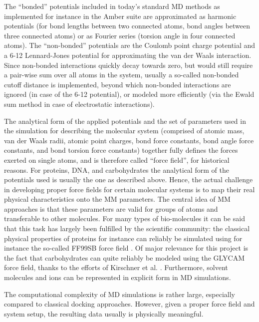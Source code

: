 The \enquote{bonded} potentials included in today's standard MD methods as
implemented for instance in the Amber suite \cite{original_amber_1981,
amber_overview_2013} are approximated as harmonic potentials (for bond lengths
between two connected atoms, bond angles between three connected atoms) or as
Fourier series (torsion angle in four connected atoms). The \enquote{non-bonded}
potentials are the Coulomb point charge potential and a 6-12 Lennard-Jones
potential for approximating the van der Waals interaction. Since non-bonded
interactions quickly decay towards zero, but would still require a pair-wise sum
over all atoms in the system, usually a so-called non-bonded cutoff distance is
implemented, beyond which non-bonded interactions are ignored (in case of the
6-12 potential), or modeled more efficiently (via the Ewald sum method in case
of electrostatic interactions).

The analytical form of the applied potentials and the set of parameters used in
the simulation for describing the molecular system (comprised of atomic mass,
van der Waals radii, atomic point charges, bond force constants, bond angle
force constants, and bond torsion force constants) together fully defines the
forces exerted on single atoms, and is therefore called \enquote{force field},
for historical reasons. For proteins, DNA, and carbohydrates the analytical form
of the potentials used is usually the one as described above. Hence, the actual
challenge in developing proper force fields for certain molecular systems is to
map their real physical characteristics onto the MM parameters. The central idea
of MM approaches is that these parameters are valid for groups of atoms and
transferable to other molecules. For many types of bio-molecules it can be said
that this task has largely been fulfilled by the scientific community: the
classical physical properties of proteins for instance can reliably be simulated
using for instance the so-called FF99SB force field
\cite{ff99sbvalidation_2009}. Of major relevance for this project is  the fact
that carbohydrates can quite reliably be modeled using the GLYCAM force field,
thanks to the efforts of Kirschner et al. \cite{kirschner_glycam06:_2008}.
Furthermore, solvent molecules and ions can be represented in explicit form in
MD simulations.

The computational complexity of MD simulations is rather large, especially
compared to classical docking approaches. However, given a proper force field
and system setup, the resulting data usually is physically meaningful.


